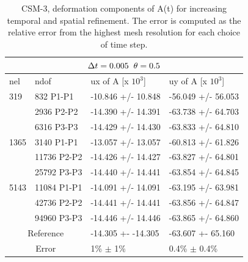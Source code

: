 \begin{table}[h!]
\centering
\label{CSM 3 Results 3}
\begin{tabular}{ |p{1cm}||p{2.7cm}|p{3.3cm}|p{3.3cm}|}
\hline
  \multicolumn{4}{|c|}{$\Delta t = 0.005 \hspace{2mm} \theta = 0.5$} \\
\hline
nel & ndof & ux of A [x $10^{3}$]  &uy of A [x $10^{3}$] \\
\hline
    319     & 832 P1-P1 & -10.846       +/-  10.848 & -56.049       +/-  56.053 \\
     & 2936 P2-P2  & -14.390       +/-  14.391 & -63.738       +/-  64.703 \\
      & 6316 P3-P3 & -14.429       +/-  14.430 & -63.833       +/-  64.810 \\
 \hline 
    1365    & 3140 P1-P1 & -13.057       +/-  13.057 & -60.813       +/-  61.826 \\
     & 11736 P2-P2& -14.426       +/-  14.427 & -63.827       +/-  64.801 \\
     & 25792 P3-P3 & -14.440       +/-  14.441 & -63.854       +/-  64.845 \\
 \hline
      5143    & 11084 P1-P1 & -14.091       +/-  14.091 & -63.195       +/-  63.981 \\
     & 42736 P2-P2 & -14.441       +/-  14.441 & -63.856       +/-  64.847 \\
     & 94960 P3-P3 & -14.446       +/-  14.446 & -63.865       +/-  64.860 \\
 \hline
  \multicolumn{2}{|c|}{Reference}  &-14.305 +- -14.305        & -63.607 +- 65.160    \\
   \hline
    \multicolumn{2}{|c|}{Error}  & 1\% $\pm$ 1\% &  0.4\% $\pm$ 0.4\%  \\
   \hline
\end{tabular}
\caption{CSM-3, deformation components of A(t) for  increasing temporal and spatial refinement. The error is computed as the relative error from the highest mesh resolution for each choice of time step.}
\end{table}


